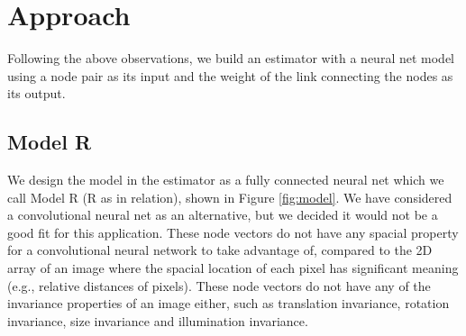 \documentclass[conference]{IEEEtran}
\begin{document}
\section{Approach}
Following the above observations,
we build an estimator with a neural net model using a node pair as its input
and the weight of the link connecting the nodes as its output.

\subsection{Model R}
We design the model in the estimator as a fully connected neural net which we call Model R (R as in relation), shown in Figure \ref{fig:model}.
We have considered a convolutional neural net as an alternative,
but we decided it would not be a good fit for this application.
These node vectors do not have any spacial property
for a convolutional neural network to take advantage of,
compared to the 2D array of an image where the spacial location of each pixel
has significant meaning (e.g., relative distances of pixels).
These node vectors do not have any of the invariance properties of an image either,
such as translation invariance, rotation invariance,
size invariance and illumination invariance.
\end{document}
